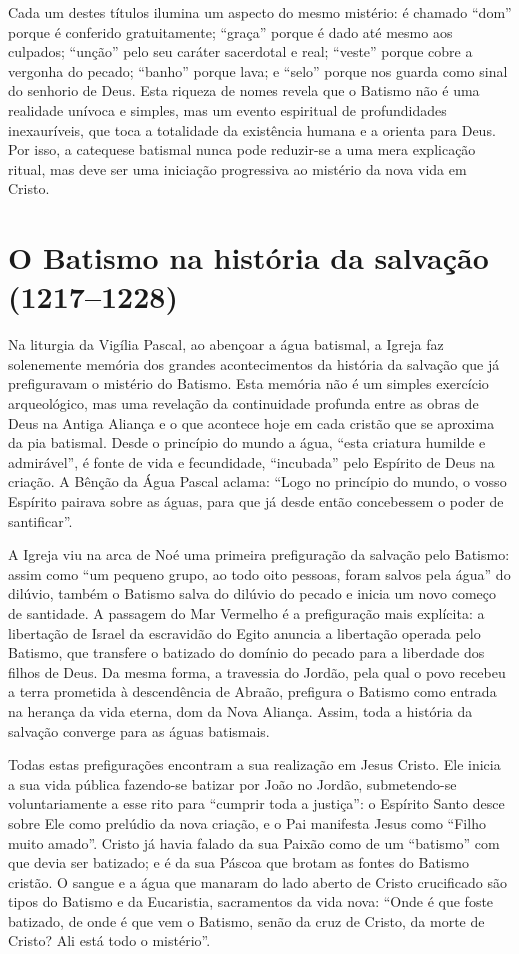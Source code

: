 Cada um destes títulos ilumina um aspecto do mesmo mistério: é chamado ``dom'' porque é conferido gratuitamente; ``graça'' porque é dado até mesmo aos culpados; ``unção'' pelo seu caráter sacerdotal e real; ``veste'' porque cobre a vergonha do pecado; ``banho'' porque lava; e ``selo'' porque nos guarda como sinal do senhorio de Deus. Esta riqueza de nomes revela que o Batismo não é uma realidade unívoca e simples, mas um evento espiritual de profundidades inexauríveis, que toca a totalidade da existência humana e a orienta para Deus. Por isso, a catequese batismal nunca pode reduzir-se a uma mera explicação ritual, mas deve ser uma iniciação progressiva ao mistério da nova vida em Cristo.

\section{O Batismo na história da salvação (1217--1228)}

Na liturgia da Vigília Pascal, ao abençoar a água batismal, a Igreja faz solenemente memória dos grandes acontecimentos da história da salvação que já prefiguravam o mistério do Batismo. Esta memória não é um simples exercício arqueológico, mas uma revelação da continuidade profunda entre as obras de Deus na Antiga Aliança e o que acontece hoje em cada cristão que se aproxima da pia batismal. Desde o princípio do mundo a água, ``esta criatura humilde e admirável'', é fonte de vida e fecundidade, ``incubada'' pelo Espírito de Deus na criação. A Bênção da Água Pascal aclama: ``Logo no princípio do mundo, o vosso Espírito pairava sobre as águas, para que já desde então concebessem o poder de santificar''.

A Igreja viu na arca de Noé uma primeira prefiguração da salvação pelo Batismo: assim como ``um pequeno grupo, ao todo oito pessoas, foram salvos pela água'' do dilúvio, também o Batismo salva do dilúvio do pecado e inicia um novo começo de santidade. A passagem do Mar Vermelho é a prefiguração mais explícita: a libertação de Israel da escravidão do Egito anuncia a libertação operada pelo Batismo, que transfere o batizado do domínio do pecado para a liberdade dos filhos de Deus. Da mesma forma, a travessia do Jordão, pela qual o povo recebeu a terra prometida à descendência de Abraão, prefigura o Batismo como entrada na herança da vida eterna, dom da Nova Aliança. Assim, toda a história da salvação converge para as águas batismais.

Todas estas prefigurações encontram a sua realização em Jesus Cristo. Ele inicia a sua vida pública fazendo-se batizar por João no Jordão, submetendo-se voluntariamente a esse rito para ``cumprir toda a justiça'': o Espírito Santo desce sobre Ele como prelúdio da nova criação, e o Pai manifesta Jesus como ``Filho muito amado''. Cristo já havia falado da sua Paixão como de um ``batismo'' com que devia ser batizado; e é da sua Páscoa que brotam as fontes do Batismo cristão. O sangue e a água que manaram do lado aberto de Cristo crucificado são tipos do Batismo e da Eucaristia, sacramentos da vida nova: ``Onde é que foste batizado, de onde é que vem o Batismo, senão da cruz de Cristo, da morte de Cristo? Ali está todo o mistério''.

